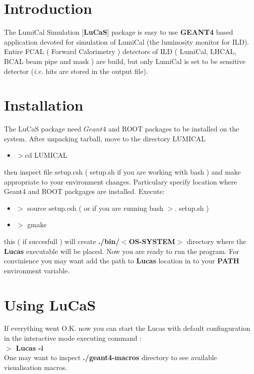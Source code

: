 \documentclass[10pt,notitlepage,twoside,a4paper]{scrartcl}
\date{2010-11-25}
\begin{document}
 
 \tableofcontents
 \newpage
 \section{Introduction}
\par The LumiCal Simulation [{\bfseries LuCaS}] package is easy to use {\bf GEANT4} based application devoted for simulation of LumiCal (the luminosity monitor for ILD). Entire FCAL ( Forward Calorimetry ) detectors of ILD ( LumiCal, LHCAL, BCAL beam pipe and mask ) are build, but only LumiCal is set to be sensitive detector ({\it i.e.} hits are stored in the output file).
\newpage

 \section{Installation}\label{instal}
The LuCaS package need $Geant4$ and ROOT packages to be installed on the system.
After unpacking tarball, move to the directory LUMICAL
\begin{itemize}
 \item $>$cd LUMICAL
\end{itemize}

then inspect file setup.csh ( setup.sh if you are working with bash )
and make appropriate to your environment changes. Particulary specify location where Geant4 and ROOT
packgages are installed. Execute:
\begin{itemize}
\item $>$ source  setup.csh ( or if you are running bash  $>$. setup.sh )
\item $>$ gmake
\end{itemize}

this ( if succesfull ) will create {\bfseries{./bin/$<$OS-SYSTEM$>$}} directory where the {\bfseries{Lucas}} executable will be placed.
Now you are ready to run the program. For convinience you may want add the path to {\bfseries{Lucas}} location in to your {\bfseries PATH} environment variable.
\newpage
 \section{Using LuCaS}\label{use}
If everything went O.K. now you can start the Lucas with default confinguration in the interactive mode executing command :\\
{\bf {$>$ Lucas -i }}\\
One may want to inspect {\bf {./geant4-macros}} directory to see available visualisation macros.
\end{document}
